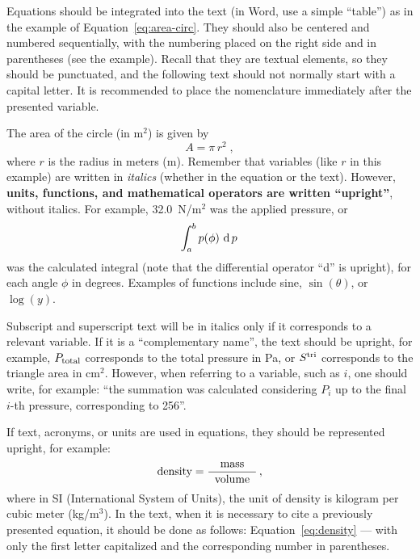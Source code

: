 Equations should be integrated into the text (in Word, use a simple ``table'') as in the example of Equation~\eqref{eq:area-circ}. They should also be centered and numbered sequentially, with the numbering placed on the right side and in parentheses (see the example). Recall that they are textual elements, so they should be punctuated, and the following text should not normally start with a capital letter. It is recommended to place the nomenclature immediately after the presented variable.

The area of the circle (in m$^2$) is given by
%
\begin{equation}
	A = \pi \, r^2\;,
\label{eq:area-circ}
\end{equation}
%
where $r$ is the radius in meters (m). Remember that variables (like $r$ in this example) are written in \textit{italics} (whether in the equation or the text). However, \textbf{units, functions, and mathematical operators are written ``upright''}, without italics. For example, 32.0~N/m$^2$ was the applied pressure, or
%
\begin{equation}
	\int_a^b p(\phi)\, \operatorname{d} p\,
\label{eq:int}
\end{equation}
%
was the calculated integral (note that the differential operator ``d'' is upright), for each angle $\phi$ in degrees. Examples of functions include sine, $\sin(\theta)$, or $\log(y)$.

Subscript and superscript text will be in italics only if it corresponds to a relevant variable. If it is a ``complementary name'', the text should be upright, for example, $P_{\text{total}}$ corresponds to the total pressure in Pa, or $S^{\text{tri}}$ corresponds to the triangle area in cm$^2$. 
%
However, when referring to a variable, such as $i$, one should write, for example: ``the summation was calculated considering $P_i$ up to the final $i$-th pressure, corresponding to 256''.

If text, acronyms, or units are used in equations, they should be represented upright, for example:
%
\begin{equation}
	\text{density} = \frac{\text{mass}}{\;\;\text{volume}\;\;}\,,
\label{eq:density}
\end{equation}
%
where in SI (International System of Units), the unit of density is kilogram per cubic meter (kg/m$^3$).
%
In the text, when it is necessary to cite a previously presented equation, it should be done as follows: Equation~\eqref{eq:density} — with only the first letter capitalized and the corresponding number in parentheses.

